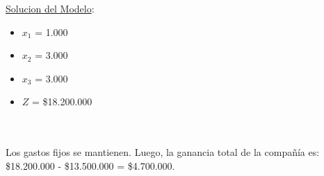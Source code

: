 \documentclass[10pt,a4paper]{article}
\begin{document}
\begin{enumerate}[label=\textbf{\sffamily\large\arabic*.}]
    \underline{Solucion del Modelo}: 

    \begin{itemize}

        \item $x_{1}$ = 1.000
        \item $x_{2}$ = 3.000
        \item $x_{3}$ = 3.000
        \item $Z$ = \$18.200.000 \\\

    \end{itemize}
    \\
    Los gastos fijos se mantienen. Luego, la ganancia total de la compañía es: \$18.200.000 - \$13.500.000 = \$4.700.000. \\
\end{enumerate}
\end{document}
